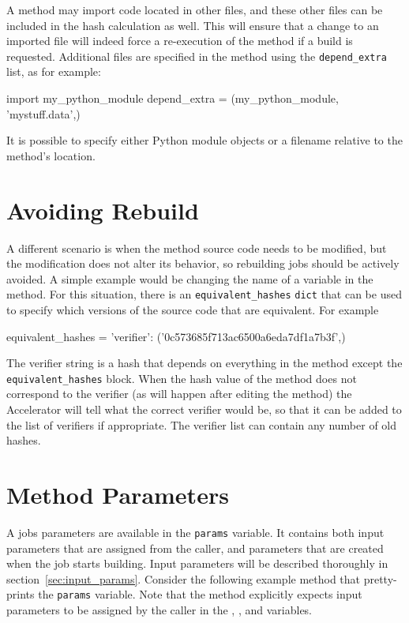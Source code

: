 A method may import code located in other files, and these other files
can be included in the hash calculation as well.  This will ensure
that a change to an imported file will indeed force a re-execution of
the method if a build is requested.  Additional files are specified in
the method using the \texttt{depend\_extra} list, as for example:
\begin{python}
import my_python_module
depend_extra = (my_python_module, 'mystuff.data',)
\end{python}
It is possible to specify either Python module objects or a filename
relative to the method's location.

\section{Avoiding Rebuild}

A different scenario is when the method source code needs to be
modified, but the modification does not alter its behavior, so
rebuilding jobs should be actively avoided.  A simple example would be
changing the name of a variable in the method.  For this situation,
there is an \texttt{equivalent\_hashes} \texttt{dict} that can be used
to specify which versions of the source code that are equivalent.  For
example
\begin{python}
equivalent_hashes = {'verifier': ('0c573685f713ac6500a6eda7df1a7b3f',)}
\end{python}
The verifier string is a hash that depends on everything in the method
except the \texttt{equivalent\_hashes} block.  When the hash value of
the method does not correspond to the verifier (as will happen after
editing the method) the Accelerator will tell what the correct
verifier would be, so that it can be added to the list of verifiers if
appropriate.  The verifier list can contain any number of old hashes.




\clearpage
\section{Method Parameters}

A jobs parameters are available in the \texttt{params} variable.  It
contains both input parameters that are assigned from the caller, and
parameters that are created when the job starts building.  Input
parameters will be described thoroughly in section~\ref{sec:input_params}.  Consider
the following example method that pretty-prints the \texttt{params}
variable.  Note that the method explicitly expects input parameters to
be assigned by the caller in the \jobids, \datasets, and \options
variables.


